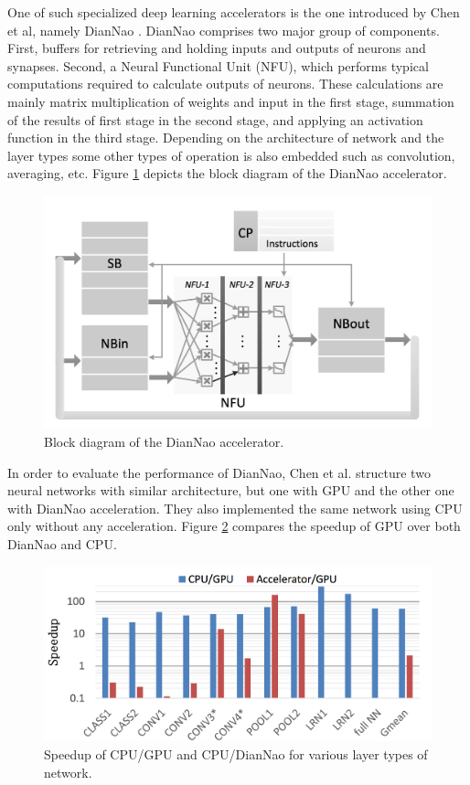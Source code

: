 \documentclass[runningheads,a4paper]{llncs}
\begin{document}
One of such specialized deep learning accelerators is the one introduced by Chen et al, namely DianNao \cite{chen2014diannao}. DianNao comprises two major group of components. First, buffers for retrieving and holding inputs and outputs of neurons and synapses. Second, a Neural Functional Unit (NFU), which performs typical computations required to calculate outputs of neurons. These calculations are mainly matrix multiplication of weights and input in the first stage, summation of the results of first stage in the second stage, and applying an activation function in the third stage. Depending on the architecture of network and the layer types some other types of operation is also embedded such as convolution, averaging, etc. Figure \ref{fig:diannao_arch} depicts the block diagram of the DianNao accelerator.
\begin{figure}[h]
	\includegraphics[scale=0.42]{./images/diannao.png}
	\centering
	\caption{Block diagram of the DianNao accelerator\cite{chen2014dadiannao}.}
	\label{fig:diannao_arch}
\end{figure}
In order to evaluate the performance of DianNao, Chen et al. structure two neural networks with similar architecture, but one with GPU and the other one with DianNao acceleration. They also implemented the same network using CPU only without any acceleration. Figure \ref{fig:diannao_speedup} compares the speedup of GPU over both DianNao and CPU.
\begin{figure}[h]
	\includegraphics[scale=0.42]{./images/diannao_speedup.png}
	\centering
	\caption{Speedup of CPU/GPU and CPU/DianNao for various layer types of network\cite{chen2014dadiannao}.}
	\label{fig:diannao_speedup}
\end{figure}
\end{document}
